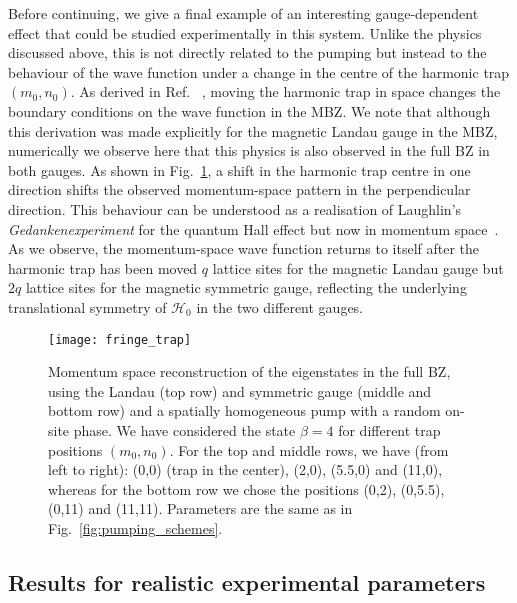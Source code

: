 \documentclass[twocolumn, 10pt, aps, superscriptaddress, floatfix, showpacs, pra, citeautoscript]{revtex4-1}
\begin{document}
Before continuing, we give a final example of an interesting gauge-dependent effect that could be studied experimentally in this system. Unlike the physics discussed above, this is not directly related to the pumping but instead to the behaviour of the wave function under a change in the centre of the harmonic trap $(m_0, n_0)$. As derived in Ref. ~, moving the
harmonic trap in space changes the boundary conditions on the wave function in the MBZ. We note that although this derivation was made explicitly for the magnetic Landau gauge in the MBZ, numerically we observe here that this physics is also observed in the full BZ in both gauges. 
As shown in Fig.~\ref{fig:moving_trap}, a shift in the harmonic trap centre in one direction shifts the observed momentum-space pattern in the perpendicular direction. This behaviour can be understood as a realisation of Laughlin's {\em Gedankenexperiment} for the quantum Hall effect but now in momentum space~\cite{ozawa2014momhh}. As we observe, the momentum-space wave function returns to itself after the harmonic trap has been moved $q$ lattice sites for the magnetic Landau gauge but $2q$ lattice sites for the magnetic symmetric gauge, reflecting the underlying translational symmetry of $\mathcal{H}_0$ in the two different gauges. 


\begin{figure}[htb]
  \centering
  \texttt{[image: fringe\_trap]} %
  \caption{Momentum space reconstruction of the eigenstates in the
    full BZ, using the Landau (top row) and symmetric gauge (middle
    and bottom row) and a spatially homogeneous pump with
    a random on-site phase. We have considered the state $\beta = 4$ for
    different trap positions $(m_0, n_0)$. For the top and middle
    rows, we have (from left to right): (0,0) (trap in the center),
    (2,0), (5.5,0) and (11,0), whereas for the bottom row we chose the
    positions (0,2), (0,5.5), (0,11) and (11,11). Parameters are the same as in Fig.~\ref{fig:pumping_schemes}.}
  \label{fig:moving_trap}
\end{figure}

\subsection{Results for realistic experimental parameters}
\label{sec:experiment}
\end{document}

